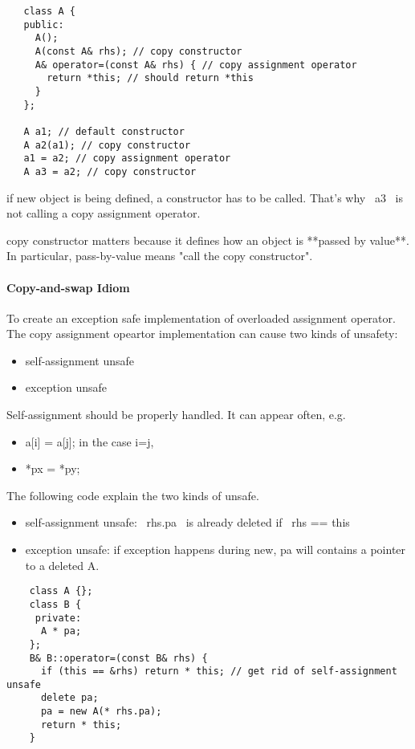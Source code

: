 \begin{lstlisting}
   class A {
   public:
     A();
     A(const A& rhs); // copy constructor
     A& operator=(const A& rhs) { // copy assignment operator
       return *this; // should return *this
     }
   };

   A a1; // default constructor
   A a2(a1); // copy constructor
   a1 = a2; // copy assignment operator
   A a3 = a2; // copy constructor
\end{lstlisting}

if new object is being defined, a constructor has to be called.
That's why ~a3~ is not calling a copy assignment operator.

copy constructor matters because it defines how an object is **passed
by value**.  In particular, pass-by-value means "call the copy
constructor".

\paragraph{Copy-and-swap Idiom}
To create an exception safe implementation of overloaded assignment operator.
The copy assignment opeartor implementation can cause two kinds of
unsafety:
\begin{itemize}
\item self-assignment unsafe
\item exception unsafe
\end{itemize}

Self-assignment should be properly handled.
It can appear often, e.g.
\begin{itemize}
\item a[i] = a[j]; in the case i=j,
\item *px = *py;
\end{itemize}

The following code explain the two kinds of unsafe.
\begin{itemize}
\item self-assignment unsafe:
  ~rhs.pa~ is already deleted if ~rhs == this~
\item exception unsafe:
  if exception happens during new, pa will contains a pointer to a deleted A.
\end{itemize}


\begin{lstlisting}
    class A {};
    class B {
     private:
      A * pa;
    };
    B& B::operator=(const B& rhs) {
      if (this == &rhs) return * this; // get rid of self-assignment unsafe
      delete pa;
      pa = new A(* rhs.pa);
      return * this;
    }
\end{lstlisting}


